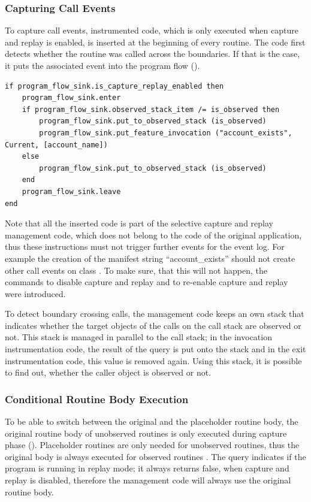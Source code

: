 \subsubsection{Capturing Call Events}
To capture call events, instrumented code, which is only executed when capture and replay is enabled, is inserted at the beginning of every routine. The code first detects whether the routine was called across the boundaries. If that is the case, it puts the associated event into the program flow ().
\begin{lstlisting}[caption=Instrumentation Code to Detect Call Events,label=lst:invocation_instrumentation]
if program_flow_sink.is_capture_replay_enabled then
	program_flow_sink.enter
	if program_flow_sink.observed_stack_item /= is_observed then
		program_flow_sink.put_to_observed_stack (is_observed)
		program_flow_sink.put_feature_invocation ("account_exists", Current, [account_name])
	else
		program_flow_sink.put_to_observed_stack (is_observed)
	end
	program_flow_sink.leave
end
\end{lstlisting}
Note that all the inserted code is part of the selective capture and replay management code, which does not belong to the code of the original application, thus these instructions must not trigger further events for the event log. For example the creation of the manifest string ``account\_exists'' should not create other call events on class . To make sure, that this will not happen, the commands  to disable capture and replay and  to re-enable capture and replay were introduced.

To detect boundary crossing calls, the management code keeps an own stack that indicates whether the target objects of the calls on the call stack are observed or not. This stack is managed in parallel to the call stack; in the invocation instrumentation code, the result of the query  is put onto the stack and in the exit instrumentation code, this value is removed again. Using this stack, it is possible to find out, whether the caller object is observed or not.


\subsubsection{Conditional Routine Body Execution}
To be able to switch between the original and the placeholder routine body, the original routine body of unobserved routines is only executed during capture phase (). Placeholder routines are only needed for unobserved routines, thus the original body is always executed for observed routines . The query  indicates if the program is running in replay mode; it always returns false, when capture and replay is disabled, therefore the management code will always use the original routine body.

